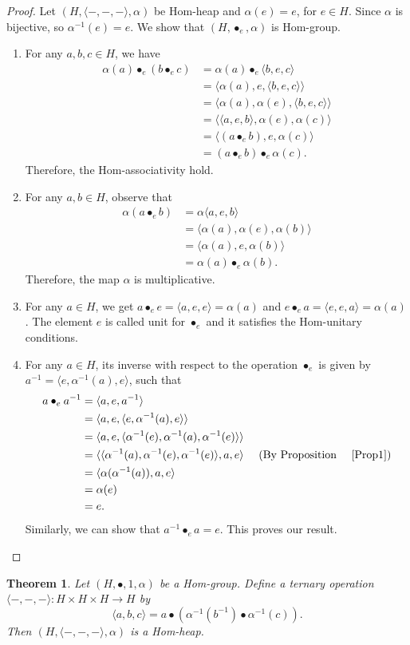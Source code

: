 \documentclass[14pt]{article}
\newtheorem{thm}{Theorem}[section]
\theoremstyle{Definition}
\theoremstyle{remark}
\begin{document}
\begin{proof}
Let $(H,\langle-,-,-\rangle, \alpha)$ be Hom-heap and $\alpha(e)=e$, for $e\in H$. Since $\alpha$ is bijective, so $\alpha^{-1}(e)=e$. We show that $(H,\bullet_{e},\alpha)$ is Hom-group.
\begin{enumerate}
\item[(1)]For any $a,b,c\in H$, we have
\begin{align*}
\alpha(a)\bullet_{e}(b\bullet_{e}c)&=\alpha(a)\bullet_{e}\langle b,e,c\rangle\\
&=\langle\alpha(a),e,\langle b,e,c\rangle\rangle\\
&=\langle\alpha(a),\alpha(e),\langle b,e,c\rangle\rangle\\
&=\langle\langle a,e,b\rangle,\alpha(e),\alpha(c)\rangle\\
&=\langle(a\bullet_{e}b),e,\alpha(c)\rangle\\
&=(a\bullet_{e}b)\bullet_{e}\alpha(c).
\end{align*}
Therefore, the Hom-associativity hold. 
\item[(2)] For any $a,b\in H$, observe that
\begin{align*}
\alpha(a\bullet_{e}b)&=\alpha\langle a,e,b\rangle\\
&=\langle\alpha(a),\alpha(e),\alpha(b)\rangle\\
&=\langle\alpha(a),e,\alpha(b)\rangle\\
&=\alpha(a)\bullet_{e}\alpha(b).
\end{align*}
Therefore, the map $\alpha$ is multiplicative.
\item[(3)]For any $a\in H$, we get $a\bullet_{e}e=\langle a,e,e\rangle=\alpha(a)$ and $e\bullet_{e}a=\langle e,e,a\rangle=\alpha(a)$. The element $e$ is called unit for $\bullet_{e}$ and it satisfies the Hom-unitary conditions.
\item[(4)]For any $a\in H$, its inverse with respect to the operation $\bullet_{e}$ is given by $a^{-1}=\langle e,\alpha^{-1}(a),e\rangle$, such that 
\begin{align*}
a\bullet_{e}a^{-1}&=\langle a,e,a^{-1}\rangle\\
&=\langle a,e,\langle e,\alpha^{-1}(a),e\rangle\rangle\\
&=\langle a,e,\langle\alpha^{-1}(e),\alpha^{-1}(a),\alpha^{-1}(e)\rangle\rangle\\
&=\langle\langle\alpha^{-1}(a),\alpha^{-1}(e),\alpha^{-1}(e)\rangle,a,e\rangle~~~~\text{(By~Proposition ~~ \ref{Prop1})}\\
&=\langle\alpha(\alpha^{-1}(a)),a,e\rangle\\
&=\alpha(e)\\
&=e.
\end{align*}
Similarly, we can show that $a^{-1}\bullet_{e}a=e$. This proves our result.
\end{enumerate}
\end{proof} 
\begin{thm}
Let $(H, \bullet, 1, \alpha)$ be a Hom-group. Define a ternary operation $\langle -,-,- \rangle : H \times H \times H \to H$ by
\[
\langle a, b, c \rangle = a \bullet(\alpha^{-1}( b^{-1}) \bullet\alpha^{-1} (c)).
\]
Then $(H, \langle -,-,- \rangle, \alpha)$ is a Hom-heap.
\end{thm}
\end{document}

